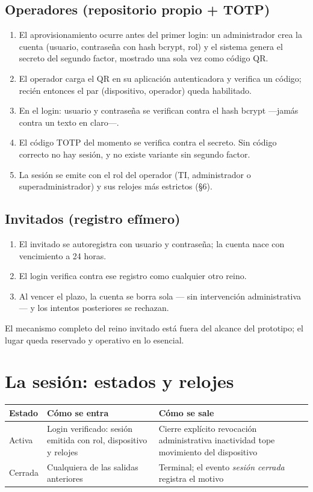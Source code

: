 \documentclass[11pt,a4paper]{article}
\begin{document}
\subsection{Operadores (repositorio propio + TOTP)}
\begin{enumerate}
\item El aprovisionamiento ocurre antes del primer login: un administrador crea la cuenta (usuario, contraseña con hash bcrypt, rol) y el sistema genera el secreto del segundo factor, mostrado una sola vez como código QR.
\item El operador carga el QR en su aplicación autenticadora y verifica un código; recién entonces el par (dispositivo, operador) queda habilitado.
\item En el login: usuario y contraseña se verifican contra el hash bcrypt ---jamás contra un texto en claro---.
\item El código TOTP del momento se verifica contra el secreto. Sin código correcto no hay sesión, y no existe variante sin segundo factor.
\item La sesión se emite con el rol del operador (TI, administrador o superadministrador) y sus relojes más estrictos (§6).
\end{enumerate}

\subsection{Invitados (registro efímero)}
\begin{enumerate}
\item El invitado se autoregistra con usuario y contraseña; la cuenta nace con vencimiento a 24 horas.
\item El login verifica contra ese registro como cualquier otro reino.
\item Al vencer el plazo, la cuenta se borra sola --- sin intervención administrativa --- y los intentos posteriores se rechazan.
\end{enumerate}
El mecanismo completo del reino invitado está fuera del alcance del prototipo; el lugar queda reservado y operativo en lo esencial.

\section{La sesión: estados y relojes}

\begin{longtable}{p{3.2cm}p{5.4cm}p{5.4cm}}
\toprule
\textbf{Estado} & \textbf{Cómo se entra} & \textbf{Cómo se sale}\\
\midrule
Activa & Login verificado: sesión emitida con rol, dispositivo y relojes & Cierre explícito \textperiodcentered{} revocación administrativa \textperiodcentered{} inactividad \textperiodcentered{} tope \textperiodcentered{} movimiento del dispositivo\\
Cerrada & Cualquiera de las salidas anteriores & Terminal; el evento \emph{sesión cerrada} registra el motivo\\
\bottomrule
\end{longtable}
\end{document}
